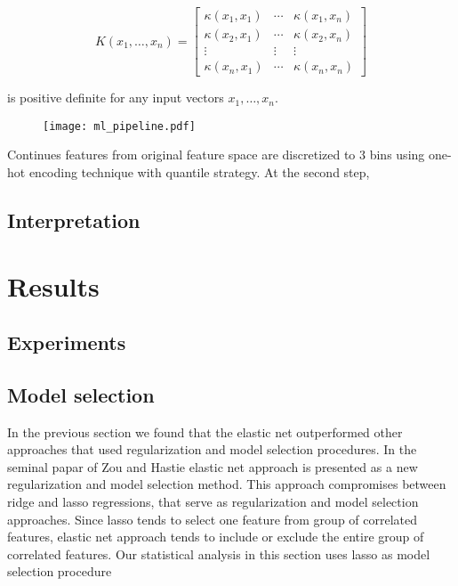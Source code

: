 \documentclass{article}
\begin{document}
\begin{equation}
  K(x_1,\ldots,x_n) = \left[\begin{array}{ccc}
    \kappa(x_1,x_1)& \cdots & \kappa(x_1,x_n)\\
    \kappa(x_2,x_1)& \cdots & \kappa(x_2,x_n)\\
    \vdots & \vdots & \vdots\\
    \kappa(x_n,x_1)& \cdots & \kappa(x_n,x_n)
  \end{array}\right]
\end{equation}

is positive definite for any input vectors $x_1,\ldots,x_n$.



\begin{figure}
  \texttt{[image: ml\_pipeline.pdf]}
\end{figure}

Continues features from original feature space are discretized to $3$ bins using one-hot encoding technique with quantile strategy. At the second step,  

\subsection{Interpretation}



\section{Results}


\subsection{Experiments}

\subsection{Model selection}
In the  previous section we found that the elastic net outperformed other approaches that used regularization and model selection procedures. In the seminal papar of Zou and Hastie elastic net approach is presented as  a new regularization and model selection method. This approach compromises between ridge and lasso regressions, that serve as regularization and model selection approaches. Since lasso tends to select one feature from group of correlated features, elastic net approach tends to include or exclude the entire group of correlated features. Our statistical analysis in this section uses lasso as model selection procedure 
\end{document}
